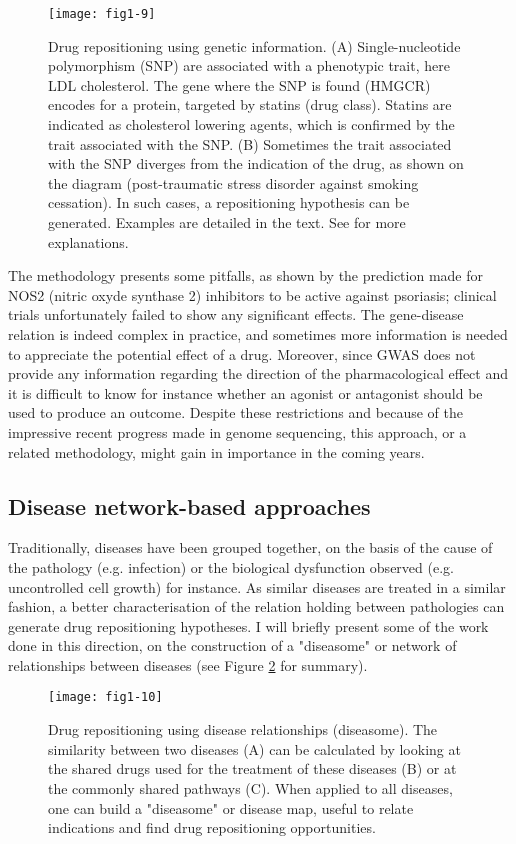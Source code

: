 \begin{figure}[ht]
    \centering
    \texttt{[image: fig1-9]}
    \caption{Drug repositioning using genetic information. (A) Single-nucleotide polymorphism (SNP) are associated with a phenotypic trait, here LDL cholesterol. The gene where the SNP is found (HMGCR) encodes for a protein, targeted by statins (drug class). Statins are indicated as cholesterol lowering agents, which is confirmed by the trait associated with the SNP. (B) Sometimes the trait associated with the SNP diverges from the indication of the drug, as shown on the diagram (post-traumatic stress disorder against smoking cessation). In such cases, a repositioning hypothesis can be generated. Examples are detailed in the text. See \cite{sanseau2012use} for more explanations.}
    \label{fig1-9}
\end{figure}

The methodology presents some pitfalls, as shown by the prediction made for NOS2 (nitric oxyde synthase 2) inhibitors to be active against psoriasis; clinical trials unfortunately failed to show any significant effects. The gene-disease relation is indeed complex in practice, and sometimes more information is needed to appreciate the potential effect of a drug. Moreover, since GWAS does not provide any information regarding the direction of the pharmacological effect and it is difficult to know for instance whether an agonist or antagonist should be used to produce an outcome. Despite these restrictions and because of the impressive recent progress made in genome sequencing, this approach, or a related methodology, might gain in importance in the coming years.

\subsection{Disease network-based approaches}

Traditionally, diseases have been grouped together, on the basis of the cause of the pathology (e.g. infection) or the biological dysfunction observed (e.g. uncontrolled cell growth) for instance. As similar diseases are treated in a similar fashion, a better characterisation of the relation holding between pathologies can generate drug repositioning hypotheses. I will briefly present some of the work done in this direction, on the construction of a "diseasome" or network of relationships between diseases (see Figure \ref{fig1-10} for summary).

\begin{figure}[ht]
    \centering
    \texttt{[image: fig1-10]}
    \caption{Drug repositioning using disease relationships (diseasome). The similarity between two diseases (A) can be calculated by looking at the shared drugs used for the treatment of these diseases (B) or at the commonly shared pathways (C). When applied to all diseases, one can build a "diseasome" or disease map, useful to relate indications and find drug repositioning opportunities.}
    \label{fig1-10}
\end{figure}

